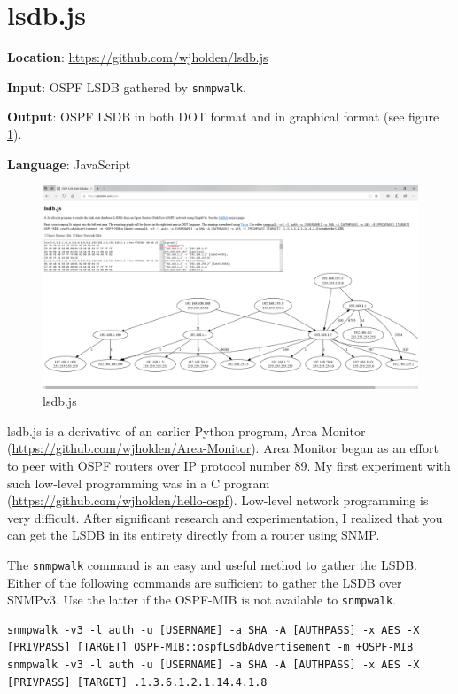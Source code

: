\documentclass[12pt]{article}
\begin{document}
\section{lsdb.js}

\textbf{Location}: \url{https://github.com/wjholden/lsdb.js}

\textbf{Input}: OSPF LSDB gathered by \texttt{snmpwalk}.

\textbf{Output}: OSPF LSDB in both DOT format and in graphical format (see figure \ref{fig:lsdb}).

\textbf{Language}: JavaScript

\begin{figure}[h]
\centering
\includegraphics[width=\textwidth]{lsdb.PNG}
\caption{lsdb.js}
\label{fig:lsdb}
\end{figure}

lsdb.js is a derivative of an earlier Python program, Area Monitor (\url{https://github.com/wjholden/Area-Monitor}). Area Monitor began as an effort to peer with OSPF routers over IP protocol number 89. My first experiment with such low-level programming was in a C program (\url{https://github.com/wjholden/hello-ospf}). Low-level network programming is very difficult. After significant research and experimentation, I realized that you can get the LSDB in its entirety directly from a router using SNMP.

The \texttt{snmpwalk} command is an easy and useful method to gather the LSDB. Either of the following commands are sufficient to gather the LSDB over SNMPv3. Use the latter if the OSPF-MIB is not available to \texttt{snmpwalk}.

\begin{lstlisting}
snmpwalk -v3 -l auth -u [USERNAME] -a SHA -A [AUTHPASS] -x AES -X [PRIVPASS] [TARGET] OSPF-MIB::ospfLsdbAdvertisement -m +OSPF-MIB
snmpwalk -v3 -l auth -u [USERNAME] -a SHA -A [AUTHPASS] -x AES -X [PRIVPASS] [TARGET] .1.3.6.1.2.1.14.4.1.8
\end{lstlisting}
\end{document}
